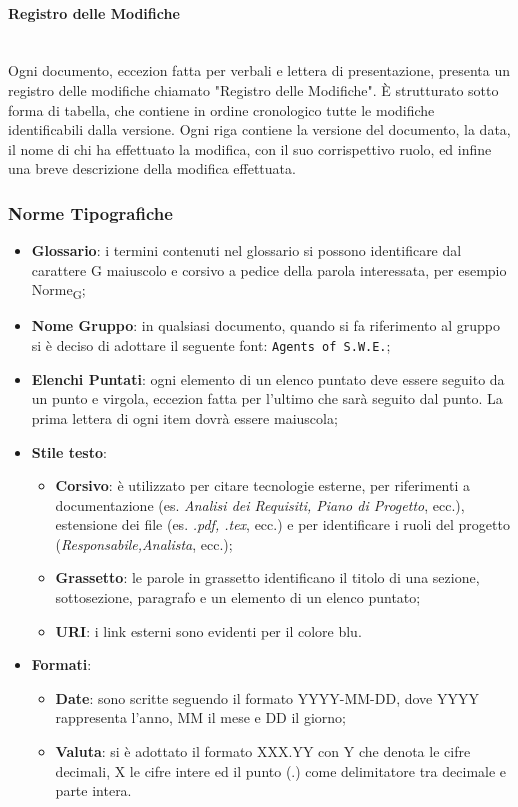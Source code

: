 \paragraph{Registro delle Modifiche} \-\\
Ogni documento, eccezion fatta per verbali e lettera di presentazione, presenta un registro delle modifiche chiamato "Registro delle Modifiche". È strutturato sotto forma di tabella, che contiene in ordine cronologico tutte le modifiche identificabili dalla versione.  Ogni riga contiene la versione del documento, la data, il nome di chi ha effettuato la modifica, con il suo corrispettivo ruolo, ed infine una breve descrizione della modifica effettuata.


\subsubsection{Norme Tipografiche}
\begin{itemize}
	\item \textbf{Glossario}: i termini contenuti nel glossario si possono identificare dal carattere G maiuscolo e corsivo a pedice della parola interessata, per esempio Norme\textsubscript{G};
	\item \textbf{Nome Gruppo}: in qualsiasi documento, quando si fa riferimento al gruppo si è deciso di adottare il seguente font: \texttt{Agents of S.W.E.};
	\item \textbf{Elenchi Puntati}: ogni elemento di un elenco puntato deve essere seguito da un punto e virgola, eccezion fatta per l'ultimo che sarà seguito dal punto. La prima lettera di ogni item dovrà essere maiuscola;
	\item \textbf{Stile testo}:
	\begin{itemize}
		\item \textbf{Corsivo}: è utilizzato per citare tecnologie esterne, per riferimenti a documentazione (es. \textit{Analisi dei Requisiti, Piano di Progetto}, ecc.), estensione dei file (es. \textit{.pdf, .tex}, ecc.) e per identificare i ruoli del progetto (\textit{Responsabile,Analista}, ecc.);
		\item \textbf{Grassetto}: le parole in grassetto identificano il titolo di una sezione, sottosezione, paragrafo e un elemento di un elenco puntato;
		\item \textbf{URI}:	i link esterni sono evidenti per il colore blu.
	\end{itemize}
	\item \textbf{Formati}:
	\begin{itemize}
		\item \textbf{Date}: sono scritte seguendo il formato YYYY-MM-DD, dove YYYY rappresenta l'anno, MM il mese e DD il giorno;
		\item \textbf{Valuta}: si è adottato il formato XXX.YY con Y che denota le cifre decimali, X le cifre intere ed il punto (.) come delimitatore tra decimale e parte intera.
	\end{itemize}
\end{itemize}


